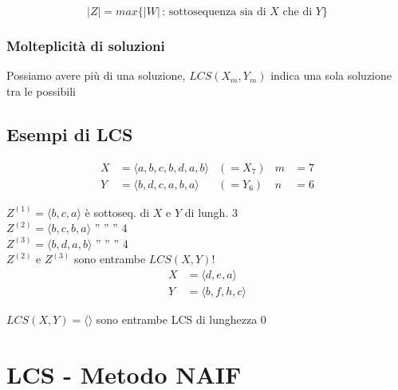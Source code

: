 $$
    |Z| = max\{|W|\, :\, \text{sottosequenza sia di } X \text{ che di } Y\}
$$

\subsubsection{Molteplicità di soluzioni}
Possiamo avere più di una soluzione, $LCS(X_m, Y_m)$ indica una sola soluzione tra le possibili

\subsection{Esempi di LCS}
\begin{align*}
X &= \langle a, b, c, b, d, a, b \rangle & (= X_7) & m &= 7 \\
Y &= \langle b, d, c, a, b, a \rangle & (= Y_6) & n &= 6
\end{align*}

\vspace{0.5cm}


\begin{center}
    $Z^{(1)} = \langle b, c, a \rangle$ è sottoseq. di $X$ e $Y$ di lungh. 3\\[1.5ex]
    $Z^{(2)} = \langle b, c, b, a \rangle$ \quad '' \hspace{1.3cm} '' \hspace{1cm} '' \hspace{1.4cm} 4\\[1.5ex]
    $Z^{(3)} = \langle b, d, a, b \rangle$ \quad '' \hspace{1.3cm} '' \hspace{1cm} '' \hspace{1.4cm} 4\\[2.5ex]
    
    
    {\Large $Z^{(2)}$ e $Z^{(3)}$ sono entrambe $LCS(X,Y)$!}\\[3ex]
    
    \begin{align*}
    X &= \langle d, e, a \rangle \\
    Y &= \langle b, f, h, c \rangle
    \end{align*}
    
    \vspace{1.5ex}
    \noindent
     $LCS(X,Y) = \langle \rangle$ sono entrambe LCS di lunghezza $0$
\end{center}

\newpage
\section{LCS - Metodo NAIF}

